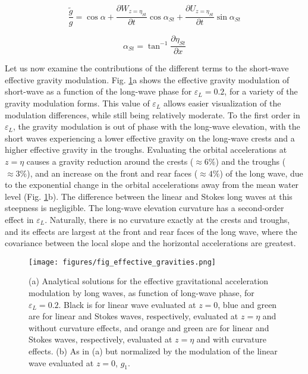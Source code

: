 \documentclass[lineno]{jfm}
\begin{document}
\begin{equation}
\label{eq:gravity_modulation_general_stokes}
\frac{\widetilde{g}}{g}
  = \cos{\alpha} 
  + \dfrac{\partial W_{z=\eta_{St}}}{\partial t} \cos{\alpha_{St}}
  + \dfrac{\partial U_{z=\eta_{St}}}{\partial t} \sin{\alpha_{St}}
\end{equation}

\begin{equation}
\label{eq:local_slope_stokes}
\alpha_{St} = \tan^{-1}{\dfrac{\partial \eta_{St}}{\partial x}}
\end{equation}

Let us now examine the contributions of the different terms to the short-wave
effective gravity modulation.
Fig. \ref{fig:effective_gravities}a shows the effective gravity modulation of
short-wave as a function of the long-wave phase for $\varepsilon_L = 0.2$, for
a variety of the gravity modulation forms.
This value of $\varepsilon_L$ allows easier visualization of the modulation
differences, while still being relatively moderate.
To the first order in $\varepsilon_L$, the gravity modulation is out of phase
with the long-wave elevation, with the short waves experiencing a lower effective
gravity on the long-wave crests and a higher effective gravity in the troughs.
Evaluating the orbital accelerations at $z=\eta$ causes a gravity reduction
around the crests ($\approx6\%$) and the troughs ($\approx 3\%$), and an
increase on the front and rear faces ($\approx 4\%$) of the long wave, due to
the exponential change in the orbital accelerations away from the mean water level
(Fig. \ref{fig:effective_gravities}b).
The difference between the linear and Stokes long waves at this steepness is
negligible.
The long-wave elevation curvature has a second-order effect in $\varepsilon_L$.
Naturally, there is no curvature exactly at the crests and troughs, and its
effects are largest at the front and rear faces of the long wave, where the
covariance between the local slope and the horizontal accelerations are greatest.

\begin{figure}
\centering
\texttt{[image: figures/fig\_effective\_gravities.png]}
\caption{
  (a) Analytical solutions for the effective gravitational acceleration
  modulation by long waves, as function of long-wave phase, for $\varepsilon_L = 0.2$.
  Black is for linear wave evaluated at $z=0$,
  blue and green are for linear and Stokes waves, respectively, evaluated at $z=\eta$ and without curvature effects,
  and orange and green are for linear and Stokes waves, respectively, evaluated at $z=\eta$ and with curvature effects.
  (b) As in (a) but normalized by the modulation of the linear wave evaluated at $z=0$, $g_1$.
}
\label{fig:effective_gravities}
\end{figure}
\end{document}
